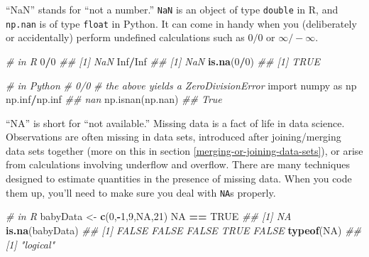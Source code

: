 \documentclass[12pt,krantz2]{krantz}
\makeatletter
\newenvironment{Shaded}{\begin{snugshade}}{\end{snugshade}}
\newcommand{\CommentTok}[1]{\textcolor[rgb]{0.37,0.37,0.37}{\textit{#1}}}
\newcommand{\DecValTok}[1]{\textcolor[rgb]{0.06,0.06,0.06}{#1}}
\newcommand{\ImportTok}[1]{#1}
\newcommand{\KeywordTok}[1]{\textcolor[rgb]{0.27,0.27,0.27}{\textbf{#1}}}
\newcommand{\NormalTok}[1]{#1}
\newcommand{\OperatorTok}[1]{\textcolor[rgb]{0.43,0.43,0.43}{\textbf{#1}}}
\newcommand{\OtherTok}[1]{\textcolor[rgb]{0.37,0.37,0.37}{#1}}
\newcommand{\StringTok}[1]{\textcolor[rgb]{0.5,0.5,0.5}{#1}}
\newenvironment{kframe}{%
\medskip{}
\setlength{\fboxsep}{.8em}
 \def\at@end@of@kframe{}%
 \ifinner\ifhmode%
  \def\at@end@of@kframe{\end{minipage}}%
  \begin{minipage}{\columnwidth}%
 \fi\fi%
 \def\FrameCommand##1{\hskip\@totalleftmargin \hskip-\fboxsep
 \colorbox{shadecolor}{##1}\hskip-\fboxsep
     \hskip-\linewidth \hskip-\@totalleftmargin \hskip\columnwidth}%
 \MakeFramed {\advance\hsize-\width
   \@totalleftmargin\z@ \linewidth\hsize
   \@setminipage}}%
 {\par\unskip\endMakeFramed%
 \at@end@of@kframe}
\renewenvironment{Shaded}{\begin{kframe}}{\end{kframe}}
\makeatother
\begin{document}
``NaN'' stands for ``not a number.'' \texttt{NaN} is an object of type \texttt{double} in R, and \texttt{np.nan} is of type \texttt{float} in Python. It can come in handy when you (deliberately or accidentally) perform undefined calculations such as \(0/0\) or \(\infty / -\infty\).

\begin{Shaded}
\begin{Highlighting}[]
\CommentTok{# in R}
\DecValTok{0}\OperatorTok{/}\DecValTok{0}
\CommentTok{## [1] NaN}
\OtherTok{Inf}\OperatorTok{/}\OtherTok{Inf}
\CommentTok{## [1] NaN}
\KeywordTok{is.na}\NormalTok{(}\DecValTok{0}\OperatorTok{/}\DecValTok{0}\NormalTok{)}
\CommentTok{## [1] TRUE}
\end{Highlighting}
\end{Shaded}

\begin{Shaded}
\begin{Highlighting}[]
\CommentTok{# in Python}
\CommentTok{# 0/0 }
\CommentTok{# the above yields a ZeroDivisionError}
\ImportTok{import}\NormalTok{ numpy }\ImportTok{as}\NormalTok{ np}
\NormalTok{np.inf}\OperatorTok{/}\NormalTok{np.inf}
\CommentTok{## nan}
\NormalTok{np.isnan(np.nan)}
\CommentTok{## True}
\end{Highlighting}
\end{Shaded}

``NA'' is short for ``not available.'' Missing data is a fact of life in data science. Observations are often missing in data sets, introduced after joining/merging data sets together (more on this in section \ref{merging-or-joining-data-sets}), or arise from calculations involving underflow and overflow. There are many techniques designed to estimate quantities in the presence of missing data. When you code them up, you'll need to make sure you deal with \texttt{NA}s properly.

\begin{Shaded}
\begin{Highlighting}[]
\CommentTok{# in R}
\NormalTok{babyData <-}\StringTok{ }\KeywordTok{c}\NormalTok{(}\DecValTok{0}\NormalTok{,}\OperatorTok{-}\DecValTok{1}\NormalTok{,}\DecValTok{9}\NormalTok{,}\OtherTok{NA}\NormalTok{,}\DecValTok{21}\NormalTok{)}
\OtherTok{NA} \OperatorTok{==}\StringTok{ }\OtherTok{TRUE} 
\CommentTok{## [1] NA}
\KeywordTok{is.na}\NormalTok{(babyData)}
\CommentTok{## [1] FALSE FALSE FALSE  TRUE FALSE}
\KeywordTok{typeof}\NormalTok{(}\OtherTok{NA}\NormalTok{)}
\CommentTok{## [1] "logical"}
\end{Highlighting}
\end{Shaded}
\end{document}
